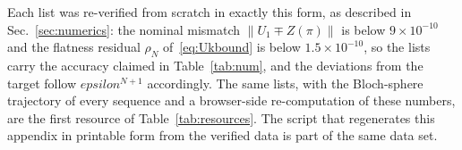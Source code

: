 \documentclass[%
  aps,
  pra,
  preprint,
  superscriptaddress,
  amsmath,amssymb,
  nofootinbib,
  floatfix,
]{revtex4-2}
\def\eps{epsilon}\def\C{C}\def\R{R}\def\lean#1{#1}\def\mathrm#1{#1}%
\theoremstyle{definition}
\theoremstyle{remark}
\newcommand{\C}{\mathbb C}
\newcommand{\R}{\mathbb R}
\newcommand{\eps}{\varepsilon}
\DeclareRobustCommand{\lean}[1]{\path{#1}}
\begin{document}
Each list was re-verified from scratch in exactly this form, as described in
Sec.~\ref{sec:numerics}: the nominal mismatch $\lVert U_1\mp Z(\pi)\rVert$ is below
$9\times10^{-10}$ and the flatness residual $\rho_N$ of~\eqref{eq:Ukbound} is below
$1.5\times10^{-10}$, so the lists carry the accuracy claimed in Table~\ref{tab:num}, and the
deviations from the target follow $\eps^{N+1}$ accordingly. The same lists, with the Bloch-sphere
trajectory of every sequence and a browser-side re-computation of these numbers, are the first
resource of Table~\ref{tab:resources}. The script that regenerates this appendix in printable
form from the verified data is part of the same data set.



\end{document}
